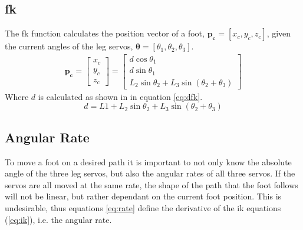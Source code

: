     \subsection{\acf{fk}}
        The \ac{fk} function calculates the position vector of a foot, \(\boldsymbol{p_c} = [x_c,y_c,z_c]\),
        given the current angles of the leg servos, \(\boldsymbol{\theta} = [\theta_1, \theta_2, \theta_3]\).
        \begin{align}
            \boldsymbol{p_c} =
                            \begin{bmatrix}
                                x_c\\
                                y_c\\
                                z_c
                            \end{bmatrix}
                            =
                            \begin{bmatrix}
                                d\cos{\theta_1}\\
                                d\sin{\theta_1}\\
                                L_2\sin{\theta_2} + L_3\sin{\left(\theta_2 + \theta_3\right)}
                            \end{bmatrix}
        \end{align}
        Where \(d\) is calculated as shown in in equation \ref{eq:dfk}.
        \begin{equation}\label{eq:dfk}
            d = L1 + L_2\sin{\theta_2} + L_3\sin{(\theta_2 + \theta_3)}
        \end{equation}
    
    \subsection{Angular Rate}
    To move a foot on a desired path it is important to not only know the absolute angle of the three leg servos, but also the angular rates of all three
    servos. If the servos are all moved at the same rate, the shape of the path that the foot follows will not be linear, but rather dependant on the
    current foot position. This is undesirable, thus equations \ref{eq:rate} define the derivative of the \ac{ik} equations (\ref{eq:ik}), i.e. the angular
    rate.

